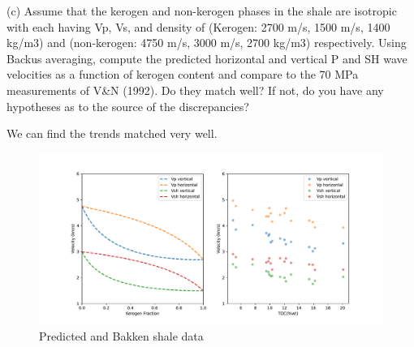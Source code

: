 \begin{problem}{(c)}
    Assume that the kerogen and non-kerogen phases in the shale are isotropic with each having Vp, Vs, and density of (Kerogen: 2700 m/s, 1500 m/s, 1400 kg/m3) and (non-kerogen: 4750 m/s, 3000 m/s, 2700 kg/m3) respectively. Using Backus averaging, compute the predicted horizontal and vertical P and SH wave velocities as a function of kerogen content and compare to the 70 MPa measurements of V\&N (1992). Do they match well? If not, do you have any hypotheses as to the source of the discrepancies?
\end{problem}
\begin{solution}
    We can find the trends matched very well.
    \begin{figure}[H]
        \centering
        \includegraphics[width=1\textwidth]{figures/homework-2/p3-c.pdf}
        \caption{Predicted and Bakken shale data}
        \label{fig:p3-c}
    \end{figure}
\end{solution}



